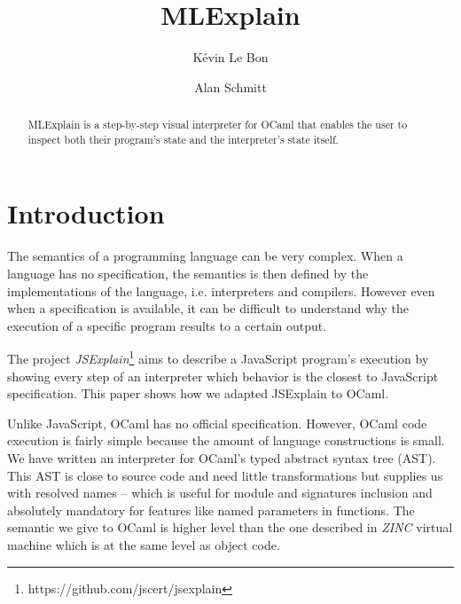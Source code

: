 \documentclass[twocolumn]{article}
\author{
	K\'evin Le Bon
	\and
	Alan Schmitt
}
\title{MLExplain}
\begin{document}
\maketitle

\begin{abstract}
	MLExplain is a step-by-step visual interpreter for OCaml that enables the user
	to inspect both their program's state and the interpreter's state itself.
\end{abstract}

\section{Introduction}

The semantics of a programming language can be very complex. When a language has no specification,
the semantics is then defined by the implementations of the language, i.e. interpreters and
compilers. However even when a specification is available, it can be difficult to understand why
the execution of a specific program results to a certain output.

The project \emph{JSExplain}\footnote{https://github.com/jscert/jsexplain} aims to describe
a JavaScript program's execution by showing every step of an interpreter which behavior is the
closest to JavaScript specification. This paper shows how we adapted JSExplain to OCaml.

Unlike JavaScript, OCaml has no official specification. However, OCaml code execution is
fairly simple because the amount of language constructions is small. We have written an
interpreter for OCaml's typed abstract syntax tree (AST). This AST is close to source code and
need little transformations but supplies us with resolved names -- which is useful for module and
signatures inclusion and absolutely mandatory for features like named parameters in functions.
The semantic we give to OCaml is higher level than the one described in \emph{ZINC}
\cite{Leroy-ZINC} virtual machine which is at the same level as object code.



\end{document}
